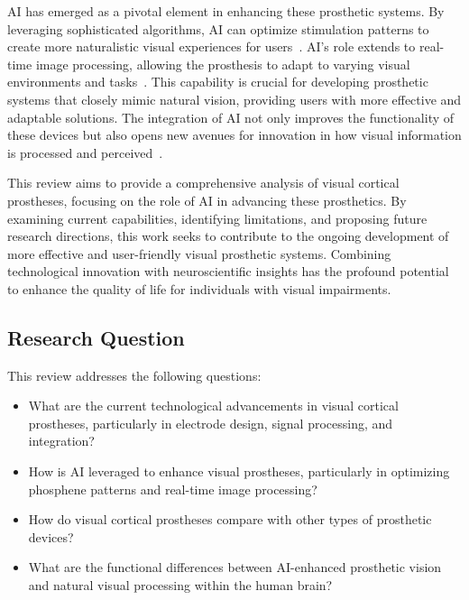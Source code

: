 \documentclass[twocolumn,10pt]{article}
\begin{document}
AI has emerged as a pivotal element in enhancing these prosthetic systems. By
leveraging sophisticated algorithms, AI can optimize stimulation patterns to
create more naturalistic visual experiences for
users~\parencite{kriegeskorteDeepNeuralNetworks2015}. AI's role extends to real-time
image processing, allowing the prosthesis to adapt to varying visual
environments and tasks~\parencite{marblestoneIntegrationDeepLearning2016}. This
capability is crucial for developing prosthetic systems that closely mimic
natural vision, providing users with more effective and adaptable solutions. The
integration of AI not only improves the functionality of these devices but also
opens new avenues for innovation in how visual information is processed and
perceived~\parencite{gallettiCorticalConnectionsArea2001}.

This review aims to provide a comprehensive analysis of visual cortical
prostheses, focusing on the role of AI in advancing these prosthetics. By
examining current capabilities, identifying limitations, and proposing future
research directions, this work seeks to contribute to the ongoing development of
more effective and user-friendly visual prosthetic systems. Combining
technological innovation with neuroscientific insights has the profound
potential to enhance the quality of life for individuals with visual
impairments.

\subsection*{Research Question}
This review addresses the following questions:
\begin{itemize}
      \item What are the current technological advancements in visual cortical
            prostheses, particularly in electrode design, signal processing, and
            integration?
      \item How is AI leveraged to enhance visual prostheses, particularly in
            optimizing phosphene patterns and real-time image
            processing?
      \item How do visual cortical prostheses compare with other types of
            prosthetic devices?
      \item What are the functional differences between AI-enhanced prosthetic
            vision and natural visual processing within the human brain?
\end{itemize}
\end{document}
